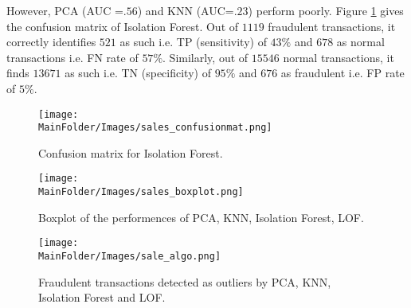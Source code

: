  \noindent However, PCA (AUC =$.56$) and KNN (AUC=$.23$) perform poorly. Figure \ref{fig_sal13} gives the confusion matrix of Isolation Forest. Out of $1119$ fraudulent transactions, it correctly identifies $521$ as such i.e. TP (sensitivity) of $43 \%$ and $678$ as normal  transactions i.e. FN rate of $ 57 \%$. Similarly, out of $15546$ normal transactions, it finds $13671$ as such i.e. TN (specificity) of $95 \%$  and $676$ as fraudulent i.e. FP  rate of $ 5\%$. 
\begin{figure}[H]
  
    \texttt{[image: \\MainFolder/Images/sales\_confusionmat.png]}
  \caption{Confusion matrix for Isolation Forest.}
    \label{fig_sal13}
\end{figure}

\begin{figure}[H]
    \texttt{[image: \\MainFolder/Images/sales\_boxplot.png]}
    \label{fig_sal12}
    \caption{Boxplot of the performences of PCA, KNN, Isolation Forest, LOF.}%
\end{figure}


\begin{figure*}[ht!]
    \centering
    \texttt{[image: \\MainFolder/Images/sale\_algo.png]}
    \caption{Fraudulent transactions detected as outliers by PCA, KNN, Isolation Forest and LOF.}%
    \label{fig_sal2}
\end{figure*}

\afterpage{\FloatBarrier}